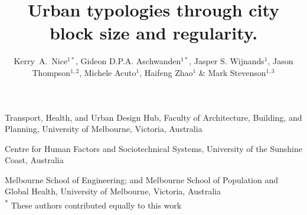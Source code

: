 \documentclass{nature}
\title{Urban typologies through city block size and regularity.}
\author{Kerry~A.~Nice$^{1*}$,
Gideon D.P.A. Aschwanden$^{1*}$,
Jasper S. Wijnands$^{1}$,
Jason Thompson$^{1,2}$,
Michele Acuto$^{1}$,
Haifeng Zhao$^{1}$ \&
Mark Stevenson$^{1,3}$
}
\begin{document}
\maketitle

\begin{affiliations}
 \item Transport, Health, and Urban Design Hub, Faculty of Architecture, Building, and Planning, University of Melbourne, Victoria, Australia
 \item Centre for Human Factors and Sociotechnical Systems, University of the Sunshine Coast, Australia
 \item Melbourne School of Engineering; and Melbourne School of Population and Global Health, University of Melbourne, Victoria, Australia
 \\ \textsuperscript{*} These authors contributed equally to this work
\end{affiliations}
\end{document}

